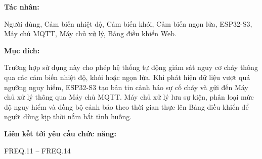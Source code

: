 \documentclass[a4paper,12pt]{article}
\begin{document}
\textbf{Tác nhân:}

Người dùng, Cảm biến nhiệt độ, Cảm biến khói, Cảm biến ngọn lửa, ESP32-S3, Máy chủ MQTT, Máy chủ xử lý, Bảng điều khiển Web.

\textbf{Mục đích:}

Trường hợp sử dụng này cho phép hệ thống tự động giám sát nguy cơ cháy thông qua các cảm biến nhiệt độ, khói hoặc ngọn lửa. Khi phát hiện dữ liệu vượt quá ngưỡng nguy hiểm, ESP32-S3 tạo bản tin cảnh báo sự cố cháy và gửi đến Máy chủ xử lý thông qua Máy chủ MQTT. Máy chủ xử lý lưu sự kiện, phân loại mức độ nguy hiểm và đồng bộ cảnh báo theo thời gian thực lên Bảng điều khiển để người dùng kịp thời nắm bắt tình huống.

\textbf{Liên kết tới yêu cầu chức năng:}

FREQ.11 -- FREQ.14
\end{document}
